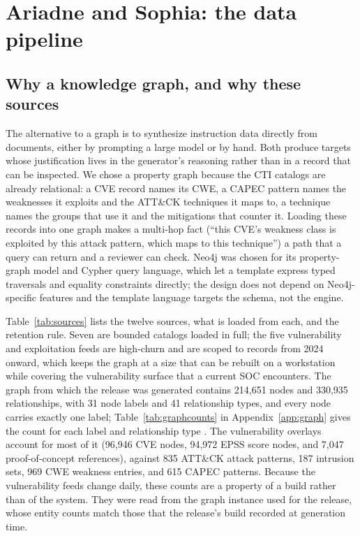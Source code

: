 \documentclass[twocolumn]{svjour3}
\begin{document}
\section{Ariadne and Sophia: the data pipeline}\label{sec:data}
\subsection{Why a knowledge graph, and why these sources}
The alternative to a graph is to synthesize instruction data directly from documents, either by prompting a large model or by hand. Both produce targets whose justification lives in the generator's reasoning rather than in a record that can be inspected. We chose a property graph because the CTI catalogs are already relational: a CVE record names its CWE, a CAPEC pattern names the weaknesses it exploits and the ATT\&CK techniques it maps to, a technique names the groups that use it and the mitigations that counter it. Loading these records into one graph makes a multi-hop fact (``this CVE's weakness class is exploited by this attack pattern, which maps to this technique'') a path that a query can return and a reviewer can check. Neo4j was chosen for its property-graph model and Cypher query language, which let a template express typed traversals and equality constraints directly; the design does not depend on Neo4j-specific features and the template language targets the schema, not the engine.

Table~\ref{tab:sources} lists the twelve sources, what is loaded from each, and the retention rule. Seven are bounded catalogs loaded in full; the five vulnerability and exploitation feeds are high-churn and are scoped to records from 2024 onward, which keeps the graph at a size that can be rebuilt on a workstation while covering the vulnerability surface that a current SOC encounters. The graph from which the release was generated contains 214,651 nodes and 330,935 relationships, with 31 node labels and 41 relationship types, and every node carries exactly one label; Table~\ref{tab:graphcounts} in Appendix~\ref{app:graph} gives the count for each label and relationship type \cite{strom2018mitre,mitreCWE,mitreCAPEC,mitreCVE}. The vulnerability overlays account for most of it (96,946 CVE nodes, 94,972 EPSS score nodes, and 7,047 proof-of-concept references), against 835 ATT\&CK attack patterns, 187 intrusion sets, 969 CWE weakness entries, and 615 CAPEC patterns. Because the vulnerability feeds change daily, these counts are a property of a build rather than of the system. They were read from the graph instance used for the release, whose entity counts match those that the release's build recorded at generation time.
\end{document}
